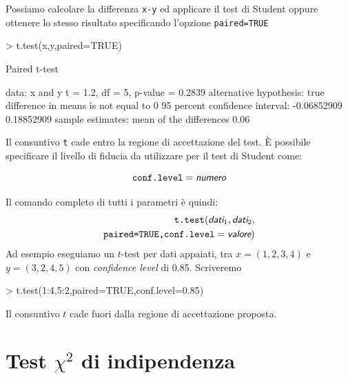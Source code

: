 \documentclass[onecolumn,12pt]{book}
\newcommand{\varia}[1]{\textsl{\textsf{#1}}}
\begin{document}
Possiamo calcolare la differenza \texttt{x-y} ed applicare il test di Student oppure ottenere lo stesso risultato specificando l'opzione \texttt{paired=TRUE}
\begin{Schunk}
\begin{Sinput}
>  t.test(x,y,paired=TRUE)
\end{Sinput}
\begin{Soutput}
	Paired t-test

data:  x and y
t = 1.2, df = 5, p-value = 0.2839
alternative hypothesis: true difference in means is not equal to 0
95 percent confidence interval:
 -0.06852909  0.18852909
sample estimates:
mean of the differences 
                   0.06 
\end{Soutput}
\end{Schunk}

Il consuntivo   \texttt{t} cade entro la regione di accettazione del test.
\`E  possibile specificare il livello di fiducia da utilizzare per il test di Student come:

$$\texttt{conf.level}=\varia{numero}$$

Il comando completo di tutti i parametri  \`e quindi:
\begin{eqnarray*}
\texttt{t.test}(\varia{dati}_1,\varia{dati}_2,
\\
\texttt{paired=TRUE,conf.level}=\varia{valore})
\end{eqnarray*}
Ad esempio eseguiamo un $t$-test per dati appaiati, tra $x=(1,2,3,4)$ e $y=(3,2,4,5)$ con {\it confidence level} di 0.85. Scriveremo
\begin{Schunk}
\begin{Sinput}
> t.test(1:4,5:2,paired=TRUE,conf.level=0.85)
\end{Sinput}
\end{Schunk}
 Il consuntivo $t$ cade fuori dalla regione di accettazione proposta.

 \section{Test $\chi^2$  di indipendenza}
\end{document}
